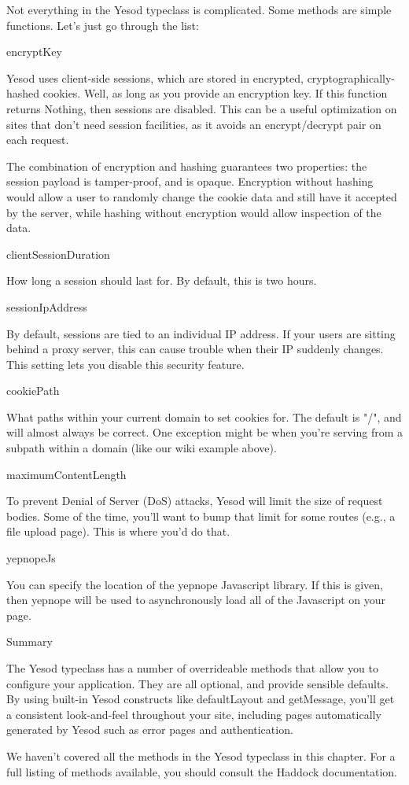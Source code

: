 Not everything in the Yesod typeclass is complicated. Some methods are simple functions. Let's just go through the list:

encryptKey

Yesod uses client-side sessions, which are stored in encrypted, cryptographically-hashed cookies. Well, as long as you provide an encryption key. If this function returns Nothing, then sessions are disabled. This can be a useful optimization on sites that don't need session facilities, as it avoids an encrypt/decrypt pair on each request.

The combination of encryption and hashing guarantees two properties: the session payload is tamper-proof, and is opaque. Encryption without hashing would allow a user to randomly change the cookie data and still have it accepted by the server, while hashing without encryption would allow inspection of the data.

clientSessionDuration

How long a session should last for. By default, this is two hours.

sessionIpAddress

By default, sessions are tied to an individual IP address. If your users are sitting behind a proxy server, this can cause trouble when their IP suddenly changes. This setting lets you disable this security feature.

cookiePath

What paths within your current domain to set cookies for. The default is "/", and will almost always be correct. One exception might be when you're serving from a subpath within a domain (like our wiki example above).

maximumContentLength

To prevent Denial of Server (DoS) attacks, Yesod will limit the size of request bodies. Some of the time, you'll want to bump that limit for some routes (e.g., a file upload page). This is where you'd do that.

yepnopeJs

You can specify the location of the yepnope Javascript library. If this is given, then yepnope will be used to asynchronously load all of the Javascript on your page.

Summary

The Yesod typeclass has a number of overrideable methods that allow you to configure your application. They are all optional, and provide sensible defaults. By using built-in Yesod constructs like defaultLayout and getMessage, you'll get a consistent look-and-feel throughout your site, including pages automatically generated by Yesod such as error pages and authentication.

We haven't covered all the methods in the Yesod typeclass in this chapter. For a full listing of methods available, you should consult the Haddock documentation.
